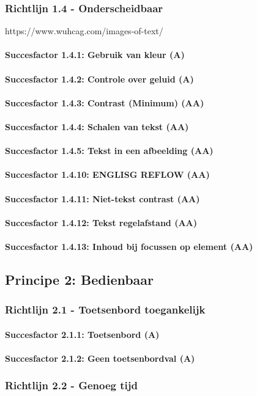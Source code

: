 \subsubsection{Richtlijn 1.4 - Onderscheidbaar}
https://www.wuhcag.com/images-of-text/
\paragraph{Succesfactor 1.4.1:  Gebruik van kleur (A)}
\paragraph{Succesfactor 1.4.2:  Controle over geluid (A)}
\paragraph{Succesfactor 1.4.3:  Contrast (Minimum) (AA)}
\paragraph{Succesfactor 1.4.4:  Schalen van tekst (AA)}
\paragraph{Succesfactor 1.4.5:  Tekst in een afbeelding (AA)}
\paragraph{Succesfactor 1.4.10:  ENGLISG REFLOW (AA)}
\paragraph{Succesfactor 1.4.11:  Niet-tekst contrast (AA)}
\paragraph{Succesfactor 1.4.12:  Tekst regelafstand (AA)}
\paragraph{Succesfactor 1.4.13:  Inhoud bij focussen op element (AA)}

\subsection{Principe 2: Bedienbaar}
\label{sec:bedienbaarWCAG}
\subsubsection{Richtlijn 2.1 - Toetsenbord toegankelijk}
\paragraph{Succesfactor 2.1.1:  Toetsenbord (A)}
\paragraph{Succesfactor 2.1.2:  Geen toetsenbordval (A)}
\subsubsection{Richtlijn 2.2 - Genoeg tijd}
